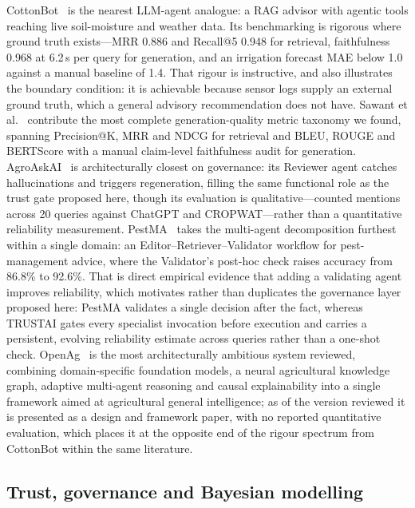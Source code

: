 \documentclass[preprint,12pt]{elsarticle}
\begin{document}
CottonBot~\cite{kandamali2025cottonbot} is the nearest LLM-agent analogue:
a RAG advisor with agentic tools reaching live soil-moisture and weather
data. Its benchmarking is rigorous where ground truth exists---MRR 0.886
and Recall@5 0.948 for retrieval, faithfulness 0.968 at 6.2\,s per query
for generation, and an irrigation forecast MAE below 1.0 against a manual
baseline of 1.4. That rigour is instructive, and also illustrates the
boundary condition: it is achievable because sensor logs supply an external
ground truth, which a general advisory recommendation does not have. Sawant
et al.~\cite{sawant2026llm} contribute the most complete generation-quality
metric taxonomy we found, spanning Precision@K, MRR and NDCG for retrieval
and BLEU, ROUGE and BERTScore with a manual claim-level faithfulness audit
for generation. AgroAskAI~\cite{cantonjos2026agroaskai} is architecturally
closest on governance: its Reviewer agent catches hallucinations and
triggers regeneration, filling the same functional role as the trust gate
proposed here, though its evaluation is qualitative---counted mentions
across 20 queries against ChatGPT and CROPWAT---rather than a quantitative
reliability measurement. PestMA~\cite{shi2025pestma} takes the
multi-agent decomposition furthest within a single domain: an
Editor--Retriever--Validator workflow for pest-management advice, where
the Validator's post-hoc check raises accuracy from 86.8\% to 92.6\%.
That is direct empirical evidence that adding a validating agent
improves reliability, which motivates rather than duplicates the
governance layer proposed here: PestMA validates a single decision
after the fact, whereas TRUSTAI gates every specialist invocation
before execution and carries a persistent, evolving reliability
estimate across queries rather than a one-shot check. OpenAg~\cite{thudumu2026openag}
is the most architecturally ambitious system reviewed, combining
domain-specific foundation models, a neural agricultural knowledge
graph, adaptive multi-agent reasoning and causal explainability into a
single framework aimed at agricultural general intelligence; as of the
version reviewed it is presented as a design and framework paper, with
no reported quantitative evaluation, which places it at the opposite
end of the rigour spectrum from CottonBot within the same literature.

\subsection{Trust, governance and Bayesian modelling}
\end{document}
